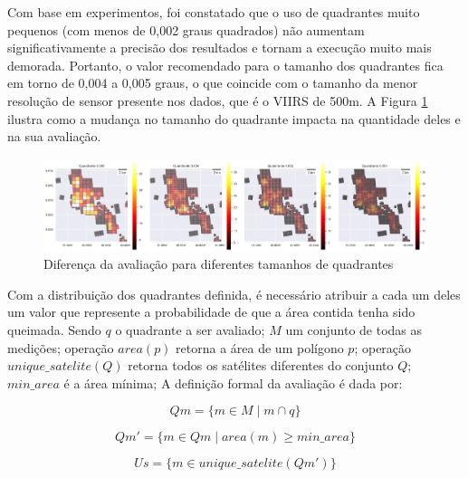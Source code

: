 \documentclass[cic,tc]{iiufrgs}
\begin{document}
Com base em experimentos, foi constatado que o uso de quadrantes muito pequenos (com menos de 0,002 graus quadrados) não aumentam significativamente a precisão dos resultados e tornam a execução muito mais demorada. Portanto, o valor recomendado para o tamanho dos quadrantes fica em torno de 0,004 a 0,005 graus, o que coincide com o tamanho da menor resolução de sensor presente nos dados, que é o VIIRS de 500m. A Figura \ref{fig:diferenca_entre_quadrantes} ilustra como a mudança no tamanho do quadrante impacta na quantidade deles e na sua avaliação. \par

\begin{figure}[H]
    \caption{Diferença da avaliação para diferentes tamanhos de quadrantes}
    \begin{center}
        \includegraphics[width=35em]{diferenca_entre_quadrantes}
    \end{center}
    \label{fig:diferenca_entre_quadrantes}
\end{figure}

Com a distribuição dos quadrantes definida, é necessário atribuir a cada um deles um valor que represente a probabilidade de que a área contida tenha sido queimada. Sendo $q$ o quadrante a ser avaliado; $M$ um conjunto de todas as medições; operação $area(p)$ retorna a área de um polígono $p$; operação $unique\_satelite(Q)$ retorna todos os satélites diferentes do conjunto $Q$; $min\_area$ é a área mínima; A definição formal da avaliação é dada por: \par

\begin{equation} \label{eqn:def_qm}
Qm = \{ m \in M \mid m \cap q \}
\end{equation}

\begin{equation} \label{eqn:def_qm_line}
Qm' = \{ m \in Qm \mid area\left(m\right) \ge min\_area \}
\end{equation}

\begin{equation} \label{eqn:def_us}
Us = \{ m \in unique\_satelite\left(Qm'\right) \}
\end{equation}
\end{document}

